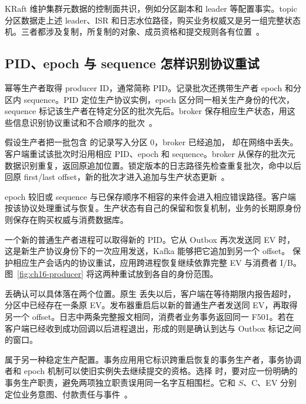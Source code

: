 KRaft 维护集群元数据的控制面共识，例如分区副本和 leader 等配置事实。topic 分区数据走上述 leader、ISR 和日志水位路径，购买业务权威又是另一组完整状态机。三者都涉及复制，所复制的对象、成员资格和提交规则各有位置~\cite{kafka44-design}。

\subsection{PID、epoch 与 sequence 怎样识别协议重试}

幂等生产者取得 producer ID，通常简称 PID。记录批次还携带生产者 epoch 和分区内 sequence。PID 定位生产协议实例，epoch 区分同一相关生产身份的代次，sequence 标记该生产者在特定分区的批次先后。broker 保存相应生产状态，用这些信息识别协议重试和不合顺序的批次~\cite{kafka44-producer}。

假设生产者把一批包含  的记录写入分区 0，broker 已经追加， 却在网络中丢失。客户端重试该批次时沿用相应 PID、epoch 和 sequence。broker 从保存的批次元数据识别重复，返回原追加位置。锁定版本的日志路径先检查重复批次，命中以后回原 first/last offset，新的批次才进入追加与生产状态更新~\cite{kafka44-replication}。

epoch 较旧或 sequence 与已保存顺序不相容的来件会进入相应错误路径。客户端按该协议处理重试与恢复。生产状态有自己的保留和恢复机制，业务的长期原身份则保存在购买权威与消费数据库。

一个新的普通生产者进程可以取得新的 PID。它从 Outbox 再次发送同 EV 时，这是新生产协议身份下的一次应用发送，Kafka 能够把它追加到另一个 offset。 保护相应生产会话内的协议重试，应用跨进程恢复继续依靠完整 EV 与消费者 I/B。图~\ref{fig:ch16-producer} 将这两种重试放到各自的身份范围。


丢确认可以具体落在两个位置。原生  丢失以后，客户端在等待期限内报告超时，分区中已经存在一条原 EV。发布器重启后以新的普通生产者发送同 EV，再取得另一个 offset。日志中两条完整报文相同，消费者业务事务返回同一 F501。若在客户端已经收到成功回调以后进程退出，形成的则是确认到达与 Outbox 标记之间的窗口。

 属于另一种稳定生产配置。事务应用用它标识跨重启恢复的事务生产者，事务协调者和 epoch 机制可以使旧实例失去继续提交的资格。选择  时，要对应一份明确的事务生产职责，避免两项独立职责误用同一名字互相围栏。它和 $S$、C、EV 分别定位业务意图、付款责任与事件~\cite{kafka44-producer}。

